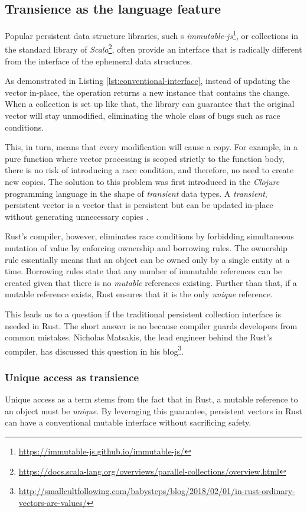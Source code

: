 \subsection{Transience as the language feature}
Popular persistent data structure libraries, such s \emph{immutable-js}\footnote{\url{https://immutable-js.github.io/immutable-js/}}, or collections in the standard library of \emph{Scala}\footnote{\url{https://docs.scala-lang.org/overviews/parallel-collections/overview.html}}, often provide an interface that is radically different from the interface of the ephemeral data structures.

As demonstrated in Listing \ref{lst:conventional-interface}, instead of updating the vector in-place, the operation returns a new instance that contains the change. When a collection is set up like that, the library can guarantee that the original vector will stay unmodified, eliminating the whole class of bugs such as race conditions.

This, in turn, means that every modification will cause a copy. For example, in a pure function where vector processing is scoped strictly to the function body, there is no risk of introducing a race condition, and therefore, no need to create new copies. The solution to this problem was first introduced in the \emph{Clojure} programming language in the shape of \emph{transient} data types. A \emph{transient}, persistent vector is a vector that is persistent but can be updated in-place without generating unnecessary copies .

Rust's compiler, however, eliminates race conditions by forbidding simultaneous mutation of value by enforcing ownership and borrowing rules. The ownership rule essentially means that an object can be owned only by a single entity at a time. Borrowing rules state that any number of immutable references can be created given that there is no \emph{mutable} references existing. Further than that, if a mutable reference exists, Rust ensures that it is the only \emph{unique} reference.

This leads us to a question if the traditional persistent collection interface is needed in Rust. The short answer is no because compiler guards developers from common mistakes. Nicholas Matsakis, the lead engineer behind the Rust's compiler, has discussed this question in his blog\footnote{\url{http://smallcultfollowing.com/babysteps/blog/2018/02/01/in-rust-ordinary-vectors-are-values/}}.

\subsubsection*{Unique access as transience}
Unique access as a term stems from the fact that in Rust, a mutable reference to an object must be \emph{unique}. By leveraging this guarantee, persistent vectors in Rust can have a conventional mutable interface without sacrificing safety.

